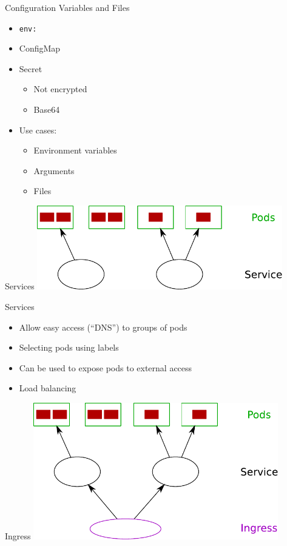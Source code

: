 \documentclass{dcpresentation}
\begin{document}
 \begin{frame}{Configuration Variables and Files}
   \begin{itemize}
    \item \texttt{env:}
    \item ConfigMap
    \item Secret
    \begin{itemize}
     \item Not encrypted
     \item Base64
    \end{itemize}
    \item Use cases:
    \begin{itemize}
     \item Environment variables
     \item Arguments
     \item Files
    \end{itemize}
   \end{itemize}
 
 \end{frame}
 
 \begin{frame}{Services}
  \centering
  \includegraphics[width=0.8\textwidth]{img/arch-ps.pdf}
 \end{frame}
 
 \begin{frame}{Services}
  \begin{itemize}
   \item Allow easy access (``DNS'') to groups of pods
   \item Selecting pods using labels
   \item Can be used to expose pods to external access
   \item Load balancing
  \end{itemize}
 \end{frame}


 \begin{frame}{Ingress}
  \centering
  \includegraphics[width=0.8\textwidth]{img/arch-psi.pdf}
 \end{frame}
 
\end{document}
